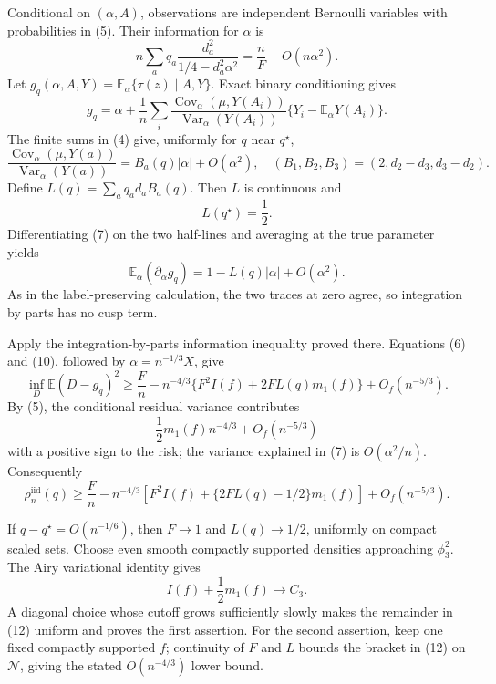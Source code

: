 Conditional on \((\alpha,A)\), observations are independent Bernoulli variables with probabilities in (5).  Their information for \(\alpha\) is
\[
n\sum_aq_a\frac{d_a^2}{1/4-d_a^2\alpha^2}
=\frac nF+O(n\alpha^2).
\tag{6}
\]
Let \(g_q(\alpha,A,Y)=\mathbb E_\alpha\{\tau(z)\mid A,Y\}\).  Exact binary conditioning gives
\[
g_q=\alpha+\frac1n\sum_i
\frac{\operatorname{Cov}_\alpha(\mu,Y(A_i))}
     {\operatorname{Var}_\alpha(Y(A_i))}
\{Y_i-\mathbb E_\alpha Y(A_i)\}.
\tag{7}
\]
The finite sums in (4) give, uniformly for \(q\) near \(q^\star\),
\[
\frac{\operatorname{Cov}_\alpha(\mu,Y(a))}
     {\operatorname{Var}_\alpha(Y(a))}
=B_a(q)|\alpha|+O(\alpha^2),
\quad
(B_1,B_2,B_3)=(2,d_2-d_3,d_3-d_2).
\tag{8}
\]
Define \(L(q)=\sum_aq_ad_aB_a(q)\).  Then \(L\) is continuous and
\[
L(q^\star)=\frac12.
\tag{9}
\]
Differentiating (7) on the two half-lines and averaging at the true parameter yields
\[
\mathbb E_\alpha(\partial_\alpha g_q)
=1-L(q)|\alpha|+O(\alpha^2).
\tag{10}
\]
As in the label-preserving calculation, the two traces at zero agree, so integration by parts has no cusp term.

Apply the integration-by-parts information inequality proved there.  Equations (6) and (10), followed by \(\alpha=n^{-1/3}X\), give
\[
\inf_D\mathbb E(D-g_q)^2
\geq
\frac Fn-n^{-4/3}
\{F^2I(f)+2FL(q)m_1(f)\}+O_f(n^{-5/3}).
\tag{11}
\]
By (5), the conditional residual variance contributes
\[
\frac12m_1(f)n^{-4/3}+O_f(n^{-5/3})
\]
with a positive sign to the risk; the variance explained in (7) is \(O(\alpha^2/n)\).  Consequently
\[
\rho_n^{\mathrm{iid}}(q)
\geq \frac Fn-n^{-4/3}
\left[F^2I(f)+\{2FL(q)-1/2\}m_1(f)\right]
+O_f(n^{-5/3}).
\tag{12}
\]

If \(q-q^\star=O(n^{-1/6})\), then \(F\to1\) and \(L(q)\to1/2\), uniformly on compact scaled sets.  Choose even smooth compactly supported densities approaching \(\phi_3^2\).  The Airy variational identity gives
\[
I(f)+\frac12m_1(f)\longrightarrow C_3.
\]
A diagonal choice whose cutoff grows sufficiently slowly makes the remainder in (12) uniform and proves the first assertion.  For the second assertion, keep one fixed compactly supported \(f\); continuity of \(F\) and \(L\) bounds the bracket in (12) on \(\mathcal N\), giving the stated \(O(n^{-4/3})\) lower bound.

